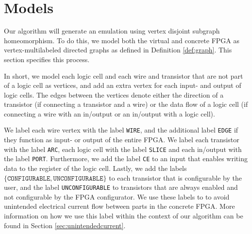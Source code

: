 \chapter{Models}
\label{chapter:models}
Our algorithm will generate an emulation using vertex disjoint subgraph homeomorphism. To do this, we model both the virtual and concrete FPGA as vertex-multilabeled directed graphs as defined in Definition \ref{def:graph}. This section specifies this process.

In short, we model each logic cell and each wire and transistor that are not part of a logic cell as vertices, and add an extra vertex for each input- and output of logic cells. The edges between the vertices denote either the direction of a transistor (if connecting a transistor and a wire) or the data flow of a logic cell (if connecting a wire with an in/output or an in/output with a logic cell).

We label each wire vertex with the label \texttt{WIRE}, and the additional label \texttt{EDGE} if they function as input- or output of the entire FPGA. We label each transistor with the label \texttt{ARC}, each logic cell with the label \texttt{SLICE} and each in/output with the label \texttt{PORT}. Furthermore, we add the label \texttt{CE} to an input that enables writing data to the register of the logic cell. Lastly, we add the labels $\{\mathtt{CONFIGURABLE}, \mathtt{UNCONFIGURABLE}\}$ to each transistor that is configurable by the user, and the label \texttt{UNCONFIGURABLE} to transistors that are always enabled and not configurable by the FPGA configurator. We use these labels to to avoid unintended electrical current flow between parts in the concrete FPGA. More information on how we use this label within the context of our algorithm can be found in Section \ref{sec:unintendedcurrent}.